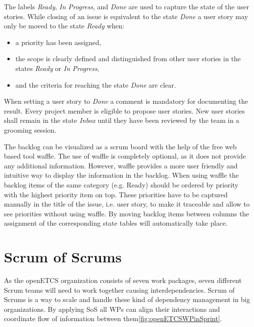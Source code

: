 The labels \textit{Ready}, \textit{In Progress}, and \textit{Done} are used to capture the state of the user stories. While closing of an issue is equivalent to the state \textit{Done} a user story may only be moved to the state \textit{Ready} when:
\begin{itemize}
\item a priority has been assigned,
\item the scope is clearly defined and distinguished from other user stories in the states \textit{Ready} or \textit{In Progress},
\item and the criteria for reaching the state \textit{Done} are clear.
\end{itemize}
When setting a user story to \textit{Done} a comment is mandatory for documenting the result. Every project member is eligible to propose user stories. New user stories shall remain in the state  \textit{Inbox} until they have been reviewed by the team in a grooming session. 


The backlog can be visualized as a scrum board with the help of the free web based tool waffle. The use of waffle is completely optional, as it does not provide any additional information. However, waffle provides a more user friendly and intuitive way to display the information in the backlog. When using waffle the backlog items of the same category (e.g. Ready) should be ordered by priority with the highest priority item on top. These priorities have to be captured manually in the title of the issue, i.e. user story, to make it traceable and allow to see priorities without using waffle. By moving backlog items between columns the assignment of the corresponding state tables will automatically take place. 

\section{Scrum of Scrums}

As the openETCS organization consists of seven work packages, seven different Scrum teams will need to work together causing interdependencies. Scrum of Scrums is a way to scale and handle  these kind of dependency management in big organizations. By applying SoS all WPs can align their interactions and coordinate flow of information between them\ref{fig:openETCSWPinSprint}.

